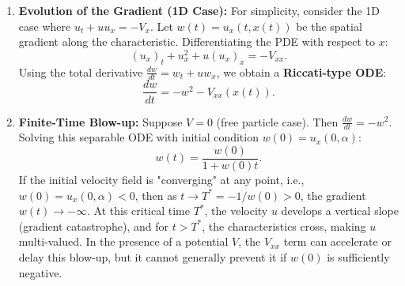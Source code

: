 \begin{solution}
\begin{enumerate}
    \item \textbf{Evolution of the Gradient (1D Case):}
    For simplicity, consider the 1D case where $u_t + u u_x = -V_x$. Let $w(t) = u_x(t, x(t))$ be the spatial gradient along the characteristic. Differentiating the PDE with respect to $x$:
    \[ (u_x)_t + u_x^2 + u (u_x)_x = -V_{xx}. \]
    Using the total derivative $\frac{dw}{dt} = w_t + u w_x$, we obtain a \textbf{Riccati-type ODE}:
    \begin{equation}
        \frac{dw}{dt} = -w^2 - V_{xx}(x(t)). \label{eq:riccati_gradient}
    \end{equation}

    \item \textbf{Finite-Time Blow-up:}
    Suppose $V=0$ (free particle case). Then $\frac{dw}{dt} = -w^2$. Solving this separable ODE with initial condition $w(0) = u_x(0, \alpha)$:
    \[ w(t) = \frac{w(0)}{1 + w(0)t}. \]
    If the initial velocity field is "converging" at any point, i.e., $w(0) = u_x(0, \alpha) < 0$, then as $t \to T^* = -1/w(0) > 0$, the gradient $w(t) \to -\infty$. 
    At this critical time $T^*$, the velocity $u$ develops a vertical slope (gradient catastrophe), and for $t > T^*$, the characteristics cross, making $u$ multi-valued. In the presence of a potential $V$, the $V_{xx}$ term can accelerate or delay this blow-up, but it cannot generally prevent it if $w(0)$ is sufficiently negative.


\end{enumerate}
\end{solution}
